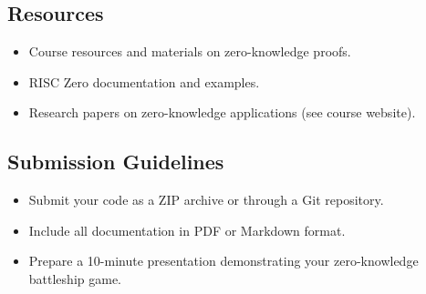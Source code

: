 \documentclass[10pt,a4paper,american]{exam}
\begin{document}
\subsection*{Resources}
\begin{itemize}
	\item Course resources and materials on zero-knowledge proofs.
	\item RISC Zero documentation and examples.
	\item Research papers on zero-knowledge applications (see course website).
\end{itemize}

\subsection*{Submission Guidelines}
\begin{itemize}
	\item Submit your code as a ZIP archive or through a Git repository.
	\item Include all documentation in PDF or Markdown format.
	\item Prepare a 10-minute presentation demonstrating your zero-knowledge battleship game.
\end{itemize}
\end{document}
